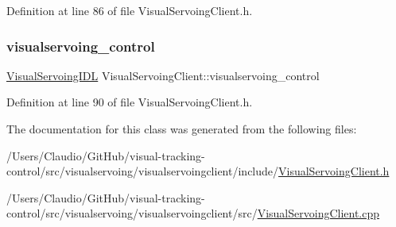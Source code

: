 Definition at line 86 of file Visual\+Servoing\+Client.\+h.

\mbox{\label{classVisualServoingClient_a13c52256db8c843064c7c7ad4fc38e13}} 
\subsubsection{\texorpdfstring{visualservoing\+\_\+control}{visualservoing\_control}}
{\footnotesize\ttfamily \hyperlink{classVisualServoingIDL}{Visual\+Servoing\+I\+DL} Visual\+Servoing\+Client\+::visualservoing\+\_\+control\hspace{0.3cm}{\ttfamily [private]}}



Definition at line 90 of file Visual\+Servoing\+Client.\+h.



The documentation for this class was generated from the following files\+:\begin{DoxyCompactItemize}
\item 
/\+Users/\+Claudio/\+Git\+Hub/visual-\/tracking-\/control/src/visualservoing/visualservoingclient/include/\hyperlink{VisualServoingClient_8h}{Visual\+Servoing\+Client.\+h}\item 
/\+Users/\+Claudio/\+Git\+Hub/visual-\/tracking-\/control/src/visualservoing/visualservoingclient/src/\hyperlink{VisualServoingClient_8cpp}{Visual\+Servoing\+Client.\+cpp}\end{DoxyCompactItemize}

